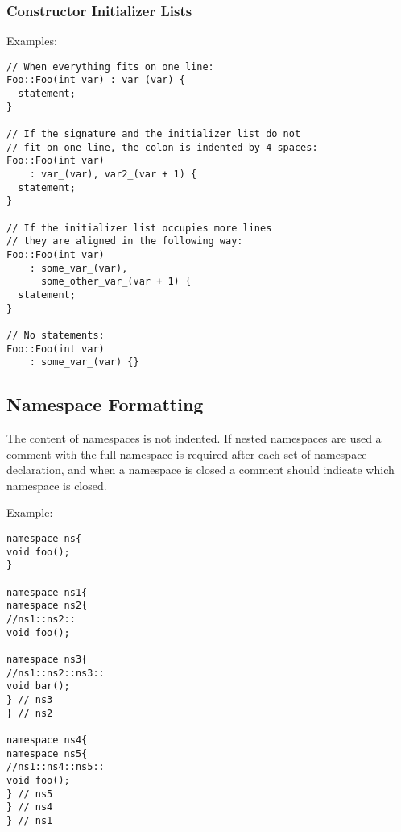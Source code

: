 \documentclass[a4paper]{article}
\begin{document}
\subsubsection{Constructor Initializer Lists}

Examples:
\begin{lstlisting}
// When everything fits on one line:
Foo::Foo(int var) : var_(var) {
  statement;
}

// If the signature and the initializer list do not
// fit on one line, the colon is indented by 4 spaces:
Foo::Foo(int var)
    : var_(var), var2_(var + 1) {
  statement;
}

// If the initializer list occupies more lines
// they are aligned in the following way:
Foo::Foo(int var)
    : some_var_(var),
      some_other_var_(var + 1) {
  statement;
}

// No statements:
Foo::Foo(int var)
    : some_var_(var) {}
\end{lstlisting}

\subsection{Namespace Formatting}

The content of namespaces is not indented.
If nested namespaces are used a comment with the full namespace is required after each set of namespace declaration,
and when a namespace is closed a comment should indicate which namespace is closed.

Example:
\begin{lstlisting}
namespace ns{
void foo();
}

namespace ns1{
namespace ns2{
//ns1::ns2::
void foo();

namespace ns3{
//ns1::ns2::ns3::
void bar();
} // ns3
} // ns2

namespace ns4{
namespace ns5{
//ns1::ns4::ns5::
void foo();
} // ns5
} // ns4
} // ns1
\end{lstlisting}
\end{document}
